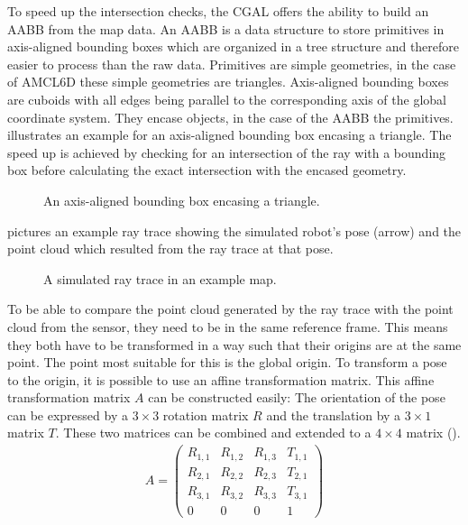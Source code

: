 \documentclass[Thesis.tex]{subfiles}
\begin{document}
To speed up the intersection checks, the \gls{CGAL} offers the ability to build an \gls{AABB}\label{page:aabb} from the map data\cite{cgal:atw-aabb-14b}. An \gls{AABB} is a data structure to store primitives in axis-aligned bounding boxes which are organized in a tree structure and therefore easier to process than the raw data. Primitives are simple geometries, in the case of \gls{AMCL6D} these simple geometries are triangles. Axis-aligned bounding boxes are cuboids with all edges being parallel to the corresponding axis of the global coordinate system. They encase objects, in the case of the \gls{AABB} the primitives.  illustrates an example for an axis-aligned bounding box encasing a triangle. 
The speed up is achieved by checking for an intersection of the ray with a bounding box before calculating the exact intersection with the encased geometry.
\begin{figure}%
  \caption{An axis-aligned bounding box encasing a triangle.}%
  \label{fig:aabb_ex}%
\end{figure}
%
 pictures an example ray trace showing the simulated robot's pose (arrow) and the point cloud which resulted from the ray trace at that pose.
\begin{figure}[!htp]
  \caption{A simulated ray trace in an example map.}
  \label{fig:raytrace}
\end{figure}
%
To be able to compare the point cloud generated by the ray trace with the point cloud from the sensor, they need to be in the same reference frame. This means they both have to be transformed in a way such that their origins are at the same point. The point most suitable for this is the global origin.
To transform a pose to the origin, it is possible to use an affine transformation matrix. This affine transformation matrix $A$ can be constructed easily: The orientation of the pose can be expressed by a $3\times3$ rotation matrix $R$ and the translation by a $3\times1$ matrix $T$. These two matrices can be combined and extended to a $4\times4$ matrix ().
\begin{align}
A = \left(\begin{array}{cccc}
      R_{1,1} & R_{1,2} & R_{1,3} & T_{1,1} \\ 
      R_{2,1} & R_{2,2} & R_{2,3} & T_{2,1} \\ 
      R_{3,1} & R_{3,2} & R_{3,3} & T_{3,1} \\
         0    &    0    &    0    &    1
    \end{array}\right)\label{form:affinetransmatrix}
\end{align}
\end{document}
